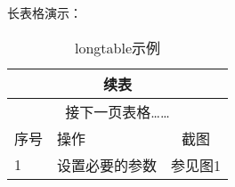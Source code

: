 \documentclass{ctexart}
\begin{document}
长表格演示：

\begin{longtable}[c]{|l|l|c|}
	\caption{longtable示例}\\
	\hline
	\endfirsthead
	\multicolumn{3}{c}{续表}\\
	\hline
	\endhead
	\multicolumn{3}{c}{接下一页表格……}\\
	\hline
	\endfoot
	\hline
	\endlastfoot
	序号 & 操作 & 截图 \\
	\hline
	1 & 设置必要的参数  & 参见图1 \\
	\hline
\end{longtable}
\end{document}

